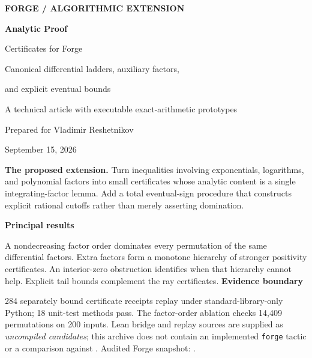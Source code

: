 \documentclass[11pt,letterpaper]{article}
\theoremstyle{definition}
\theoremstyle{remark}
\newcommand{\forge}{\texttt{forge}}
\newcommand{\code}[1]{\texttt{\detokenize{#1}}}
\begin{document}
\hypersetup{pageanchor=false}
\begin{titlepage}
\vspace*{0.45in}
{\small\sffamily\bfseries\color{Ink} FORGE / ALGORITHMIC EXTENSION}\par
\vspace{0.35in}
{\Huge\bfseries Analytic Proof\par Certificates for Forge}\par
\vspace{0.22in}
{\Large Canonical differential ladders, auxiliary factors,\par and explicit eventual bounds}\par
\vspace{0.35in}
{\large A technical article with executable exact-arithmetic prototypes}\par
\vspace{0.15in}
Prepared for Vladimir Reshetnikov\par
September 15, 2026\par
\vspace{0.3in}
\begin{tcolorbox}[colback=Pale,colframe=Ink!40,boxrule=0.4pt,arc=0pt]
\textbf{The proposed extension.} Turn inequalities involving exponentials, logarithms,
and polynomial factors into small certificates whose analytic content is a
single integrating-factor lemma. Add a total eventual-sign procedure that
constructs explicit rational cutoffs rather than merely asserting domination.
\end{tcolorbox}
\vspace{0.15in}
\textbf{Principal results}\par
A nondecreasing factor order dominates every permutation of the same differential
factors. Extra factors form a monotone hierarchy of stronger positivity
certificates. An interior-zero obstruction identifies when that hierarchy
cannot help. Explicit tail bounds complement the ray certificates.
\vfill
\textbf{Evidence boundary}\par
284 separately bound certificate receipts replay under standard-library-only
Python; 18 unit-test methods pass. The factor-order ablation checks 14,409
permutations on 200 inputs. Lean bridge and replay sources are supplied as
\emph{uncompiled candidates}; this archive does not contain an implemented
\forge{} tactic or a comparison against \code{grind}.
\vspace{0.15in}
{\small Audited Forge snapshot: .}
\end{titlepage}
\end{document}
